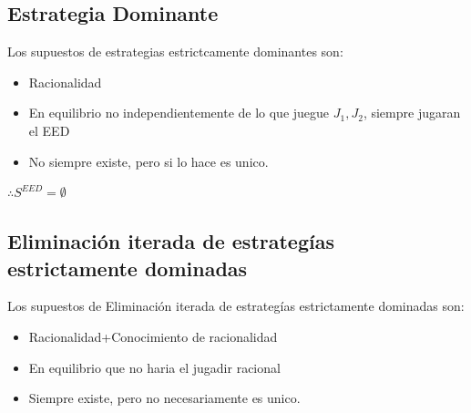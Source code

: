 \documentclass[12pt]{article}
\begin{document}
\subsection{Estrategia Dominante}
Los supuestos de estrategias estrictcamente dominantes son: 
\begin{itemize}
    \item Racionalidad
    \item En equilibrio no independientemente de lo que juegue $J_1,J_2$, siempre jugaran el EED
    \item No siempre existe, pero si lo hace es unico. 
\end{itemize}
$\therefore S^{EED}=\emptyset$
\subsection{Eliminación iterada de estrategías estrictamente dominadas}
Los supuestos de Eliminación iterada de estrategías estrictamente dominadas son: 
\begin{itemize}
    \item Racionalidad+Conocimiento de racionalidad
    \item En equilibrio que no haria el jugadir racional
    \item Siempre existe, pero no necesariamente es unico.
\end{itemize}
\end{document}
